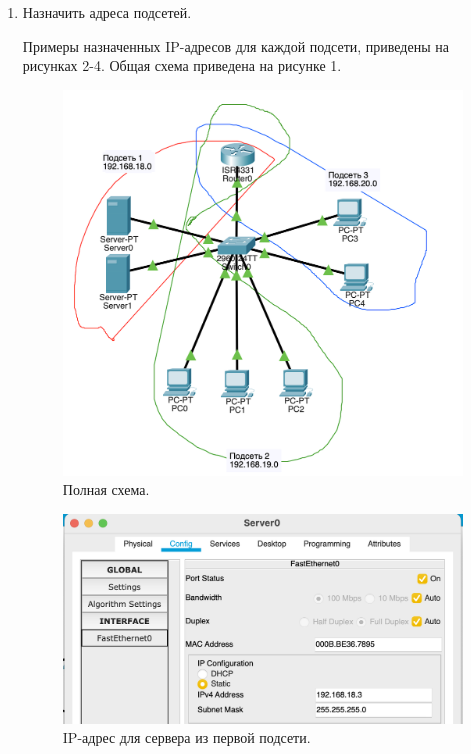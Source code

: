 \documentclass[a4paper,14pt]{extreport} %
\begin{document}
\begin{enumerate}

\item Назначить адреса подсетей.

Примеры назначенных IP-адресов для каждой подсети, приведены на рисунках 2-4. Общая схема приведена на рисунке 1.

\begin{figure}[H]
  \centering
  \includegraphics[scale=0.8]{9}
  \caption{Полная схема. }
\end{figure}

\begin{figure}[H]
  \centering
  \includegraphics[scale=0.56]{5}
  \caption{IP-адрес для сервера из первой подсети. }
\end{figure}


\end{enumerate}
\end{document}
